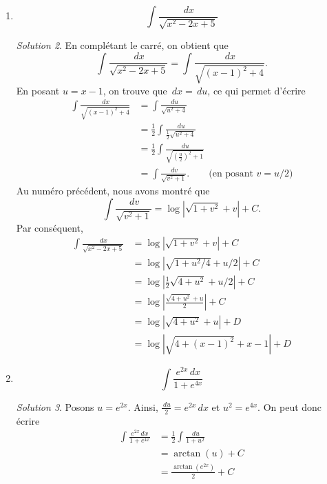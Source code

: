 \documentclass[
  12pt,
  letterpaper,
]{book}
\theoremstyle{remark}
\newtheorem*{solution}{Solution}
\begin{document}
\begin{enumerate}
\begin{solution}
  \end{solution}
\item
  \[\int\frac{\,dx}{\sqrt{x^2-2x+5}}\]

  \begin{solution}

  En complétant le carré, on obtient que
  \[\int\frac{\,dx}{\sqrt{x^2-2x+5}}=\int\frac{\,dx}{\sqrt{(x-1)^2+4}}.\]
  En posant \(u=x-1\), on trouve que \(\,dx=\,du\), ce qui permet
  d'écrire \begin{align}
  \int\frac{\,dx}{\sqrt{(x-1)^2+4}}&=\int\frac{\,du}{\sqrt{u^2+4}} \\
  &=\frac{1}{2}\int\frac{\,du}{\frac{1}{2}\sqrt{u^2+4}} \\
  &=\frac{1}{2}\int\frac{\,du}{\sqrt{\left(\frac{u}{2}\right)^2+1}} \\
  &=\int\frac{\,dv}{\sqrt{v^2+1}}. \qquad\text{(en posant $v=u/2$)}
  \end{align} Au numéro précédent, nous avons montré que
  \[\int\frac{\,dv}{\sqrt{v^2+1}}=\log\left|\sqrt{1+v^2}+v\right|+C.\]
  Par conséquent, \begin{align}
  \int\frac{\,dx}{\sqrt{x^2-2x+5}}&=\log\left|\sqrt{1+v^2}+v\right|+C \\
  &=\log\left|\sqrt{1+u^2/4}+u/2\right|+C \\
  &=\log\left|\frac{1}{2}\sqrt{4+u^2}+u/2\right|+C \\
  &=\log\left|\frac{\sqrt{4+u^2}+u}{2}\right|+C \\
  &=\log\left|\sqrt{4+u^2}+u\right|+D \\
  &=\log\left|\sqrt{4+(x-1)^2}+x-1\right|+D
  \end{align}

  \end{solution}
\item
  \[\int\frac{e^{2x}\,dx}{1+e^{4x}}\]

  \begin{solution}

  Posons \(u=e^{2x}\). Ainsi, \(\frac{\,du}{2}=e^{2x}\,dx\) et
  \(u^2=e^{4x}\). On peut donc écrire \begin{align}
  \int\frac{e^{2x}\,dx}{1+e^{4x}}&=\frac{1}{2}\int\frac{\,du}{1+u^2} \\
  &=\arctan(u)+C \\
  &=\frac{\arctan(e^{2x})}{2}+C
  \end{align}

  \end{solution}
\end{enumerate}
\end{document}
